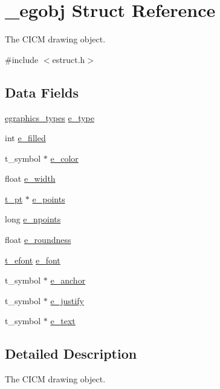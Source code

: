 \hypertarget{struct__egobj}{\section{\-\_\-egobj Struct Reference}
\label{struct__egobj}
}


The C\-I\-C\-M drawing object.  




{\ttfamily \#include $<$estruct.\-h$>$}

\subsection*{Data Fields}
\begin{DoxyCompactItemize}
\item 
\hyperlink{estruct_8h_acc57a0407e8e1eaa69028654742baf3f}{egraphics\-\_\-types} \hyperlink{struct__egobj_a8083c24bd4930af629d483d7bf45a20a}{e\-\_\-type}
\item 
int \hyperlink{struct__egobj_ae13e50cb319a060b3e612c39d0fc698d}{e\-\_\-filled}
\item 
t\-\_\-symbol $\ast$ \hyperlink{struct__egobj_a13dfb00aea95e0dc5b9d1297260a9280}{e\-\_\-color}
\item 
float \hyperlink{struct__egobj_abe0dac7e3167ea1dd6c4e238ab4ab8bd}{e\-\_\-width}
\item 
\hyperlink{struct__pt}{t\-\_\-pt} $\ast$ \hyperlink{struct__egobj_a579eafd42827c9bdcddc613774309ad3}{e\-\_\-points}
\item 
long \hyperlink{struct__egobj_a216eff6ab0216b35e215bd1c1b8fb0d0}{e\-\_\-npoints}
\item 
float \hyperlink{struct__egobj_ab2c5a6f93a125c4862295e28aad05a74}{e\-\_\-roundness}
\item 
\hyperlink{struct__efont}{t\-\_\-efont} \hyperlink{struct__egobj_a4bf02b4e1a6c0c7723b5ed198f45e0b0}{e\-\_\-font}
\item 
t\-\_\-symbol $\ast$ \hyperlink{struct__egobj_a26003aea4ac1d50f79a5db2e05599222}{e\-\_\-anchor}
\item 
t\-\_\-symbol $\ast$ \hyperlink{struct__egobj_a41dc1b542ee19a3171a52480dff2c664}{e\-\_\-justify}
\item 
t\-\_\-symbol $\ast$ \hyperlink{struct__egobj_a5f97b246c0da885ff0cd44b32a967338}{e\-\_\-text}
\end{DoxyCompactItemize}


\subsection{Detailed Description}
The C\-I\-C\-M drawing object. 

